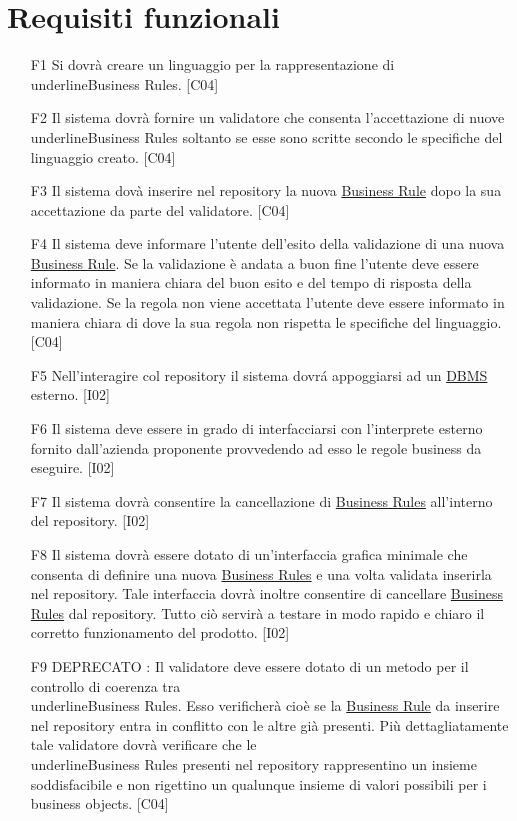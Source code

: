 \section{Requisiti funzionali}
\begin{itemize}
\item[F1]{Si dovr\`a creare un linguaggio per la rappresentazione di \\underline{Business Rules}. [C04]}
\item[F2]{Il sistema dovr\`a fornire un validatore che consenta l'accettazione di nuove \\underline{Business Rules} soltanto se esse sono scritte secondo le specifiche del linguaggio creato. [C04]}
\item[F3]{Il sistema dov\`a inserire nel repository la nuova \underline{Business Rule} dopo la sua accettazione da parte del validatore. [C04]}
\item[F4]{Il sistema deve informare l'utente dell'esito della validazione di una nuova \underline{Business Rule}. Se la validazione \`e andata a buon fine l'utente deve essere informato in maniera chiara del buon esito e del tempo di risposta della validazione. Se la regola non viene accettata l'utente deve essere informato in maniera chiara di dove la sua regola non rispetta le specifiche del linguaggio. [C04]}
\item[F5]{Nell'interagire col repository il sistema dovr\'a appoggiarsi ad un \underline{DBMS} esterno. [I02]}
\item[F6]{Il sistema deve essere in grado di interfacciarsi con l'interprete esterno fornito dall'azienda proponente provvedendo ad esso le regole business da eseguire. [I02]}
\item[F7]{Il sistema dovr\`a consentire la cancellazione di \underline{Business Rules} all'interno del repository. [I02]}
\item[F8]{Il sistema dovr\`a essere dotato di un'interfaccia grafica minimale che consenta di definire una nuova \underline{Business Rules} e una volta validata inserirla nel repository. Tale interfaccia dovr\`a inoltre consentire di cancellare \underline{Business Rules} dal repository. Tutto ci\`o servir\`a a testare in modo rapido e chiaro il corretto funzionamento del prodotto. [I02]}
\item[F9]{ DEPRECATO : Il validatore deve essere dotato di un metodo per il controllo di coerenza tra \\underline{Business Rules}. Esso verificher\`a cio\`e se la \underline{Business Rule} da inserire nel repository entra in conflitto con le altre gi\`a presenti. Pi\`u dettagliatamente tale validatore dovr\`a verificare che le \\underline{Business Rules} presenti nel repository rappresentino un insieme soddisfacibile e non rigettino un qualunque insieme di valori possibili per i business objects. [C04]}

\end{itemize}

